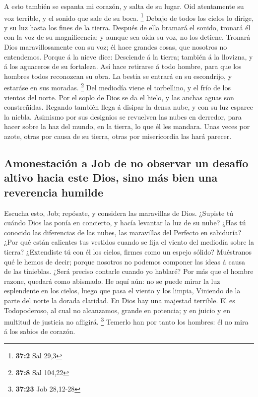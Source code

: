  A esto también se espanta mi corazón, y salta de su
lugar.  Oid atentamente su voz terrible, y el sonido que
sale de su boca. \footnote{\textbf{37:2} Sal 29,3}  Debajo
de todos los cielos lo dirige, y su luz hasta los fines de la tierra.
 Después de ella bramará el sonido, tronará él con la voz
de su magnificencia; y aunque sea oída su voz, no los detiene.
 Tronará Dios maravillosamente con su voz; él hace grandes
cosas, que nosotros no entendemos.  Porque á la nieve
dice: Desciende á la tierra; también á la llovizna, y á los aguaceros de
su fortaleza.  Así hace retirarse á todo hombre, para que
los hombres todos reconozcan su obra.  La bestia se
entrará en su escondrijo, y estaráse en sus moradas. \footnote{\textbf{37:8}
  Sal 104,22}  Del mediodía viene el torbellino, y el frío
de los vientos del norte.  Por el soplo de Dios se da el
hielo, y las anchas aguas son constreñidas.  Regando
también llega á disipar la densa nube, y con su luz esparce la niebla.
 Asimismo por sus designios se revuelven las nubes en
derredor, para hacer sobre la haz del mundo, en la tierra, lo que él les
mandara.  Unas veces por azote, otras por causa de su
tierra, otras por misericordia las hará parecer.

\hypertarget{amonestaciuxf3n-a-job-de-no-observar-un-desafuxedo-altivo-hacia-este-dios-sino-muxe1s-bien-una-reverencia-humilde}{%
\subsection{Amonestación a Job de no observar un desafío altivo hacia
este Dios, sino más bien una reverencia
humilde}\label{amonestaciuxf3n-a-job-de-no-observar-un-desafuxedo-altivo-hacia-este-dios-sino-muxe1s-bien-una-reverencia-humilde}}

 Escucha esto, Job; repósate, y considera las maravillas
de Dios.  ¿Supiste tú cuándo Dios las ponía en concierto,
y hacía levantar la luz de su nube?  ¿Has tú conocido las
diferencias de las nubes, las maravillas del Perfecto en sabiduría?
 ¿Por qué están calientes tus vestidos cuando se fija el
viento del mediodía sobre la tierra?  ¿Extendiste tú con
él los cielos, firmes como un espejo sólido?  Muéstranos
qué le hemos de decir; porque nosotros no podemos componer las ideas á
causa de las tinieblas.  ¿Será preciso contarle cuando yo
hablaré? Por más que el hombre razone, quedará como abismado.
 He aquí aún: no se puede mirar la luz esplendente en los
cielos, luego que pasa el viento y los limpia,  Viniendo
de la parte del norte la dorada claridad. En Dios hay una majestad
terrible.  El es Todopoderoso, al cual no alcanzamos,
grande en potencia; y en juicio y en multitud de justicia no afligirá.
\footnote{\textbf{37:23} Job 28,12-28}  Temerlo han por
tanto los hombres: él no mira á los sabios de corazón.

